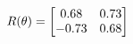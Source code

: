 \documentclass[preview]{standalone}
\begin{document}
\begin{align*}
\special{dvisvgm:raw <g id='unique000'>}R(\theta) = \begin{bmatrix}0.68 & 0.73\\-0.73 & 0.68\end{bmatrix}\special{dvisvgm:raw </g>}
\end{align*}
\end{document}
